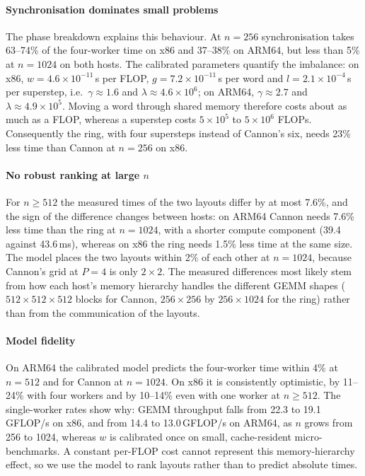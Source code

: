\documentclass[11pt,a4paper]{article}
\begin{document}
\paragraph{Synchronisation dominates small problems}
The phase breakdown explains this behaviour. At $n=256$ synchronisation takes 63--74\% of the four-worker
time on x86 and 37--38\% on ARM64, but less than 5\% at $n=1024$ on both hosts. The calibrated parameters
quantify the imbalance: on x86, $w=4.6\times10^{-11}$\,s per FLOP, $g=7.2\times10^{-11}$\,s per word and
$l=2.1\times10^{-4}$\,s per superstep, i.e.\ $\gamma\approx1.6$ and $\lambda\approx4.6\times10^6$; on ARM64,
$\gamma\approx2.7$ and $\lambda\approx4.9\times10^5$. Moving a word through shared memory therefore costs
about as much as a FLOP, whereas a superstep costs $5\times10^5$ to $5\times10^6$ FLOPs. Consequently the
ring, with four supersteps instead of Cannon's six, needs 23\% less time than Cannon at $n=256$ on x86.

\paragraph{No robust ranking at large $n$}
For $n\ge512$ the measured times of the two layouts differ by at most 7.6\%, and the sign of the
difference changes between hosts: on ARM64 Cannon needs 7.6\% less time than the ring at $n=1024$, with a
shorter compute component (39.4 against 43.6\,ms), whereas on x86 the ring needs 1.5\% less time at the
same size. The model places the two layouts within 2\% of each other at $n=1024$, because Cannon's grid at
$P=4$ is only $2\times2$. The measured differences most likely stem from how each host's memory hierarchy
handles the different GEMM shapes ($512\times512\times512$ blocks for Cannon, $256\times256$ by
$256\times1024$ for the ring) rather than from the communication of the layouts.

\paragraph{Model fidelity}
On ARM64 the calibrated model predicts the four-worker time within 4\% at $n=512$ and for Cannon at
$n=1024$. On x86 it is consistently optimistic, by 11--24\% with four workers and by 10--14\% even with one
worker at $n\ge512$. The single-worker rates show why: GEMM throughput falls from 22.3 to 19.1\,GFLOP/s on
x86, and from 14.4 to 13.0\,GFLOP/s on ARM64, as $n$ grows from 256 to 1024, whereas $w$ is calibrated once
on small, cache-resident micro-benchmarks. A constant per-FLOP cost cannot represent this memory-hierarchy
effect, so we use the model to rank layouts rather than to predict absolute times.
\end{document}
